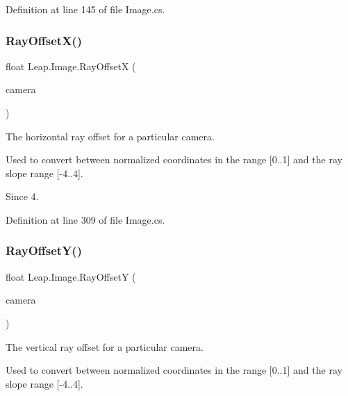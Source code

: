 Definition at line 145 of file Image.\+cs.

\mbox{\label{class_leap_1_1_image_aefd21949a969ba875fad9af1fa1c6158}} 
\subsubsection{\texorpdfstring{RayOffsetX()}{RayOffsetX()}}
{\footnotesize\ttfamily float Leap.\+Image.\+Ray\+OffsetX (\begin{DoxyParamCaption}\item[{\mbox{\hyperlink{class_leap_1_1_image_a28310e43e0f2d7f7117e1b45330bdc38}{Camera\+Type}}}]{camera }\end{DoxyParamCaption})}



The horizontal ray offset for a particular camera. 

Used to convert between normalized coordinates in the range \mbox{[}0..1\mbox{]} and the ray slope range \mbox{[}-\/4..4\mbox{]}.

\begin{DoxySince}{Since}
4. 
\end{DoxySince}


Definition at line 309 of file Image.\+cs.

\mbox{\label{class_leap_1_1_image_a2cca6b718a6ef06bb2da024abaec9ee9}} 
\subsubsection{\texorpdfstring{RayOffsetY()}{RayOffsetY()}}
{\footnotesize\ttfamily float Leap.\+Image.\+Ray\+OffsetY (\begin{DoxyParamCaption}\item[{\mbox{\hyperlink{class_leap_1_1_image_a28310e43e0f2d7f7117e1b45330bdc38}{Camera\+Type}}}]{camera }\end{DoxyParamCaption})}



The vertical ray offset for a particular camera. 

Used to convert between normalized coordinates in the range \mbox{[}0..1\mbox{]} and the ray slope range \mbox{[}-\/4..4\mbox{]}.

